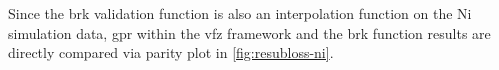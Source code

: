 \documentclass[final,twocolumn,12pt]{elsarticle}
\begin{document}
Since the \gls{brk} validation function is also an interpolation function on the Ni simulation data, \gls{gpr} within the \gls{vfz} framework and the \gls{brk} function results are directly compared via parity plot in \cref{fig:resubloss-ni}.

\end{document}
